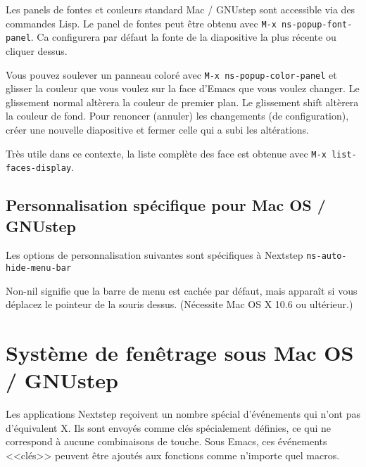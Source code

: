Les panels de fontes et couleurs standard Mac / GNUstep sont
accessible via des commandes Lisp. Le panel de fontes peut être obtenu
avec \texttt{M-x ns-popup-font-panel}. Ca configurera par défaut la
fonte de la diapositive la plus récente ou cliquer dessus.

Vous pouvez soulever un panneau coloré avec \texttt{M-x ns-popup-color-panel}
et glisser la couleur que vous voulez sur la face d'Emacs que vous
voulez changer. Le glissement normal altèrera la couleur de premier
plan. Le glissement shift altèrera la couleur de fond. Pour renoncer
(annuler) les changements (de configuration), créer une nouvelle
diapositive et fermer celle qui a subi les altérations.

Très utile dans ce contexte, la liste complète des face est obtenue
avec \texttt{M-x list-faces-display}.

\subsection{Personnalisation spécifique pour Mac OS /
  GNUstep}\label{appFsec2subsec2} 

Les options de personnalisation suivantes sont spécifiques à Nextstep
\texttt{ns-auto-hide-menu-bar}

Non-nil signifie que la barre de menu est cachée par défaut, mais
apparaît si vous déplacez le pointeur de la souris dessus. (Nécessite
Mac OS X 10.6 ou ultérieur.)

\section{Système de fenêtrage sous Mac OS / GNUstep}\label{appFsec3}

Les applications Nextstep reçoivent un nombre spécial d'événements qui
n'ont pas d'équivalent X. Ils sont envoyés comme clés spécialement
définies, ce qui ne correspond à aucune combinaisons de touche. Sous
Emacs, ces événements <<clés>> peuvent être ajoutés aux fonctions
comme n'importe quel macros.

